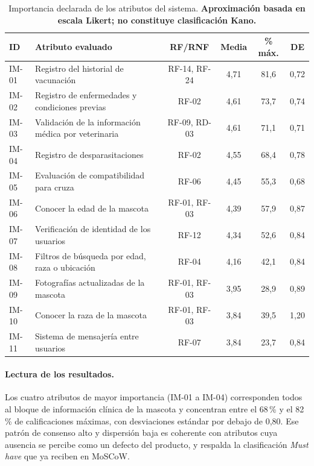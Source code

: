 \documentclass[journal,onecolumn]{IEEEtran}
\begin{document}
	\begin{table}[H]
		\centering
		\caption[Importancia declarada de los atributos (aproximación, no Kano)]{Importancia declarada de los atributos del sistema. \textbf{Aproximación basada en escala Likert; no constituye clasificación Kano.}}
		\label{tab:importancia-declarada}
		\small
		\begin{tabularx}{\textwidth}{@{}l X c c c c@{}}
			\toprule
			\textbf{ID} & \textbf{Atributo evaluado} & \textbf{RF/RNF} & \textbf{Media} & \textbf{\% máx.} & \textbf{DE} \\
			\midrule
			IM-01 & Registro del historial de vacunación & RF-14, RF-24 & 4,71 & 81,6 & 0,72 \\
			IM-02 & Registro de enfermedades y condiciones previas & RF-02 & 4,61 & 73,7 & 0,74 \\
			IM-03 & Validación de la información médica por veterinaria & RF-09, RD-03 & 4,61 & 71,1 & 0,71 \\
			IM-04 & Registro de desparasitaciones & RF-02 & 4,55 & 68,4 & 0,78 \\
			IM-05 & Evaluación de compatibilidad para cruza & RF-06 & 4,45 & 55,3 & 0,68 \\
			IM-06 & Conocer la edad de la mascota & RF-01, RF-03 & 4,39 & 57,9 & 0,87 \\
			IM-07 & Verificación de identidad de los usuarios & RF-12 & 4,34 & 52,6 & 0,84 \\
			IM-08 & Filtros de búsqueda por edad, raza o ubicación & RF-04 & 4,16 & 42,1 & 0,84 \\
			IM-09 & Fotografías actualizadas de la mascota & RF-01, RF-03 & 3,95 & 28,9 & 0,89 \\
			IM-10 & Conocer la raza de la mascota & RF-01, RF-03 & 3,84 & 39,5 & 1,20 \\
			IM-11 & Sistema de mensajería entre usuarios & RF-07 & 3,84 & 23,7 & 0,84 \\
			\bottomrule
		\end{tabularx}
	\end{table}
	
	\paragraph{Lectura de los resultados.}
	Los cuatro atributos de mayor importancia (IM-01 a IM-04) corresponden todos
	al bloque de información clínica de la mascota y concentran entre el 68\,\%
	y el 82\,\% de calificaciones máximas, con desviaciones estándar por debajo
	de 0,80. Ese patrón de consenso alto y dispersión baja es coherente con
	atributos cuya ausencia se percibe como un defecto del producto, y respalda
	la clasificación \emph{Must have} que ya reciben en MoSCoW.
	
\end{document}
